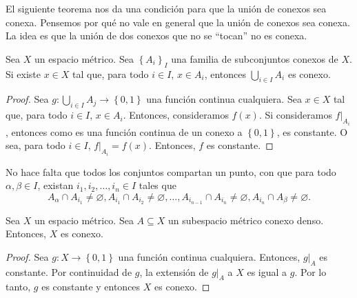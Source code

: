 El siguiente teorema nos da una condición para que la unión de conexos sea conexa. Pensemos por qué no vale en general que la unión de conexos sea conexa. La idea es que la unión de dos conexos que no se ``tocan'' no es conexa.

\begin{center}
	
\end{center}

\begin{theorem}
	Sea $X$ un espacio métrico. Sea $\left\{ A_i \right\}_I$ una familia de subconjuntos conexos de $X$. Si existe $x \in X$ tal que, para todo $i \in I$, $x \in A_i$, entonces $\bigcup_{i \in I} A_i$ es conexo.
\end{theorem}

\begin{proof}
	Sea $g : \bigcup_{i \in I} A_j \to \left\{ 0, 1 \right\}$ una función continua cualquiera. Sea $x \in X$ tal que, para todo $i \in I$, $x \in A_i$. Entonces, consideramos $f(x)$. Si consideramos $f|_{A_i}$, entonces como es una función continua de un conexo a $\left\{ 0, 1 \right\}$, es constante. O sea, para todo $i \in I$, $f|_{A_i} = f(x)$. Entonces, $f$ es constante.
\end{proof}

\begin{remark}
	No hace falta que todos los conjuntos compartan un punto, con que para todo $\alpha, \beta \in I$, existan $i_1, i_2, \ldots, i_n \in I$ tales que
	\begin{equation*}
		A_{\alpha} \cap A_{i_1} \neq \varnothing, A_{i_1} \cap A_{i_2} \neq \varnothing, \ldots, A_{i_{n-1}} \cap A_{i_n} \neq \varnothing, A_{i_n} \cap A_{\beta} \neq \varnothing.
	\end{equation*}

	\begin{center}
		
	\end{center}
\end{remark}

\begin{proposition}
	Sea $X$ un espacio métrico. Sea $A \subseteq X$ un subespacio métrico conexo denso. Entonces, $X$ es conexo.
\end{proposition}

\begin{proof}
	Sea $g : X \to \left\{ 0, 1 \right\}$ una función continua cualquiera. Entonces, $g|_A$ es constante. Por continuidad de $g$, la extensión de $g|_A$ a $X$ es igual a $g$. Por lo tanto, $g$ es constante y entonces $X$ es conexo.
\end{proof}

